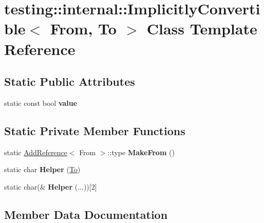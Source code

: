 \hypertarget{classtesting_1_1internal_1_1_implicitly_convertible}{}\section{testing\+:\+:internal\+:\+:Implicitly\+Convertible$<$ From, To $>$ Class Template Reference}
\label{classtesting_1_1internal_1_1_implicitly_convertible}
\subsection*{Static Public Attributes}
\begin{DoxyCompactItemize}
\item 
static const bool {\bfseries value}
\end{DoxyCompactItemize}
\subsection*{Static Private Member Functions}
\begin{DoxyCompactItemize}
\item 
\mbox{\label{classtesting_1_1internal_1_1_implicitly_convertible_adb692b091aebd0cde316c8c2c0ab661f}} 
static \mbox{\hyperlink{structtesting_1_1internal_1_1_add_reference}{Add\+Reference}}$<$ From $>$\+::type {\bfseries Make\+From} ()
\item 
\mbox{\label{classtesting_1_1internal_1_1_implicitly_convertible_a20029a4415e5f9ae152b8fce8b124980}} 
static char {\bfseries Helper} (\mbox{\hyperlink{classtesting_1_1internal_1_1_to}{To}})
\item 
\mbox{\label{classtesting_1_1internal_1_1_implicitly_convertible_aba219f30a4cbba407d8141ce53fbfeb7}} 
static char(\& {\bfseries Helper} (...))\mbox{[}2\mbox{]}
\end{DoxyCompactItemize}


\subsection{Member Data Documentation}
\mbox{\label{classtesting_1_1internal_1_1_implicitly_convertible_aea51cecabca681fb75659e224771b7b7}} 
